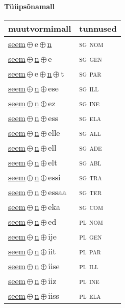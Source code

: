 

\vspace{3.5em}
\noindent \begin{minipage}{\textwidth}
\noindent \textbf{Tüüpsõnamall \,}\\

\begin{sideways}
\begin{tabular}{l l}
muutvormimall & tunnused \\
\hline
\underline{seem}\,$\oplus$\,e\,$\oplus$\,\underline{n} & \textsc{ sg nom } \\
\underline{seem}\,$\oplus$\,\underline{n}\,$\oplus$\,e & \textsc{ sg gen } \\
\underline{seem}\,$\oplus$\,e\,$\oplus$\,\underline{n}\,$\oplus$\,t & \textsc{ sg par } \\
\underline{seem}\,$\oplus$\,\underline{n}\,$\oplus$\,ese & \textsc{ sg ill } \\
\underline{seem}\,$\oplus$\,\underline{n}\,$\oplus$\,ez & \textsc{ sg ine } \\
\underline{seem}\,$\oplus$\,\underline{n}\,$\oplus$\,ess & \textsc{ sg ela } \\
\underline{seem}\,$\oplus$\,\underline{n}\,$\oplus$\,elle & \textsc{ sg all } \\
\underline{seem}\,$\oplus$\,\underline{n}\,$\oplus$\,ell & \textsc{ sg ade } \\
\underline{seem}\,$\oplus$\,\underline{n}\,$\oplus$\,elt & \textsc{ sg abl } \\
\underline{seem}\,$\oplus$\,\underline{n}\,$\oplus$\,essi & \textsc{ sg tra } \\
\underline{seem}\,$\oplus$\,\underline{n}\,$\oplus$\,essaa & \textsc{ sg ter } \\
\underline{seem}\,$\oplus$\,\underline{n}\,$\oplus$\,eka & \textsc{ sg com } \\
\underline{seem}\,$\oplus$\,\underline{n}\,$\oplus$\,ed & \textsc{ pl nom } \\
\underline{seem}\,$\oplus$\,\underline{n}\,$\oplus$\,ije & \textsc{ pl gen } \\
\underline{seem}\,$\oplus$\,\underline{n}\,$\oplus$\,iit & \textsc{ pl par } \\
\underline{seem}\,$\oplus$\,\underline{n}\,$\oplus$\,iise & \textsc{ pl ill } \\
\underline{seem}\,$\oplus$\,\underline{n}\,$\oplus$\,iiz & \textsc{ pl ine } \\
\underline{seem}\,$\oplus$\,\underline{n}\,$\oplus$\,iiss & \textsc{ pl ela } \\

\end{tabular}
\end{sideways}
\end{minipage}
